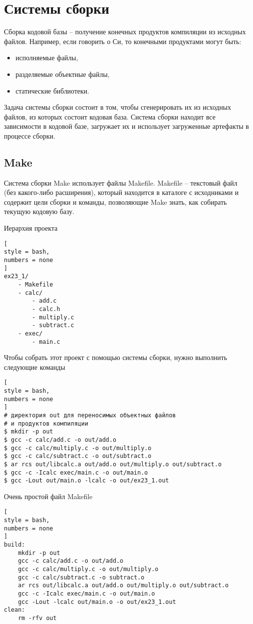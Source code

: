 \documentclass[%
	11pt,
	a4paper,
	utf8,
		]{article}
\begin{document}
\section{Системы сборки}

Сборка кодовой базы -- получение конечных продуктов компиляции из исходных файлов. Например, если говорить о Си, то конечными продуктами могут быть:
\begin{itemize}
	\item исполняемые файлы,
	
	\item разделяемые объектные файлы,
	
	\item статические библиотеки.
\end{itemize}

Задача системы сборки состоит в том, чтобы сгенерировать их из исходных файлов, из которых состоит кодовая база. Система сборки находит все зависимости в кодовой базе, загружает их и использует загруженные артефакты в процессе сборки.

\subsection{Make}

Система сборки Make использует файлы Makefile. Makefile -- текстовый файл (без какого-либо расширения), который находится в каталоге с исходниками и содержит цели сборки и команды, позволяющие Make знать, как собирать текущую кодовую базу.

Иерархия проекта
\begin{lstlisting}[
style = bash,
numbers = none
]
ex23_1/
    - Makefile
    - calc/
        - add.c
        - calc.h
        - multiply.c
        - subtract.c
    - exec/
        - main.c
\end{lstlisting}

Чтобы собрать этот проект с помощью системы сборки, нужно выполнить следующие команды
\begin{lstlisting}[
style = bash,
numbers = none
]
# директория out для переносимых объектных файлов
# и продуктов компиляции
$ mkdir -p out 
$ gcc -c calc/add.c -o out/add.o
$ gcc -c calc/multiply.c -o out/multiply.o
$ gcc -c calc/subtract.c -o out/subtract.o
$ ar rcs out/libcalc.a out/add.o out/multiply.o out/subtract.o
$ gcc -c -Icalc exec/main.c -o out/main.o
$ gcc -Lout out/main.o -lcalc -o out/ex23_1.out
\end{lstlisting}

Очень простой файл Makefile
\begin{lstlisting}[
style = bash,
numbers = none
]
build:
    mkdir -p out
    gcc -c calc/add.c -o out/add.o
    gcc -c calc/multiply.c -o out/multiply.o
    gcc -c calc/subtract.c -o subtract.o
    ar rcs out/libcalc.a out/add.o out/multiply.o out/subtract.o
    gcc -c -Icalc exec/main.c -o out/main.o
    gcc -Lout -lcalc out/main.o -o out/ex23_1.out
clean:
    rm -rfv out
\end{lstlisting}
\end{document}
